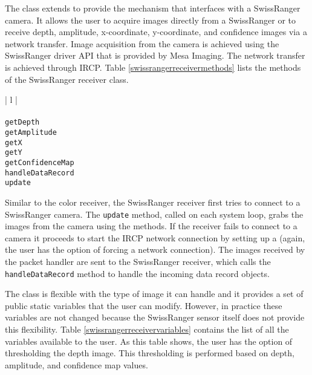 The \SwissRangerReceiver{} class extends \CameraReceiver{} to provide the mechanism that interfaces with a 
SwissRanger camera. It allows the user to acquire images directly from a SwissRanger or to receive depth, 
amplitude, x-coordinate, y-coordinate, and confidence images via a network transfer. Image acquisition from 
the camera is achieved using the SwissRanger driver API that is provided by Mesa Imaging. The network 
transfer is achieved through IRCP. Table \ref{swissrangerreceivermethods} lists the methods of the 
SwissRanger receiver class.

\begin{table}[ht]
\caption{Public methods in the \SwissRangerReceiver{} class}
\begin{center}
\begin{tabular}{| l |}
	\hline 
	 \\
	 \\
	\hline \hline
	\texttt{getDepth} \\
	\texttt{getAmplitude} \\
	\texttt{getX} \\
	\texttt{getY} \\
	\texttt{getConfidenceMap} \\
	\texttt{handleDataRecord} \\
	\texttt{update} \\
	\hline
\end{tabular}
\end{center}
\label{swissrangerreceivermethods}
\end{table}

Similar to the color receiver, the SwissRanger receiver first tries to connect to a Swiss\-Ranger camera. The 
\texttt{up\-date} method, called on each system loop, grabs the images from the camera using the 
\SwissRangerJavaAcquire{} methods. If the receiver fails to connect to a camera it proceeds to start the IRCP 
network connection by setting up a \SwissRangerPacketHandler{} (again, the user has the option of forcing a 
network connection). The images received by the packet handler are sent to the SwissRanger receiver, which 
calls the \texttt{han\-dle\-Da\-ta\-Re\-cord} method to handle the incoming data record objects.

The \SwissRangerReceiver{} class is flexible with the type of image it can handle and it provides a set of 
public static variables that the user can modify. However, in practice these variables are not changed 
because the SwissRanger sensor itself does not provide this flexibility. Table \ref{swissrangerreceivervariables} 
contains the list of all the variables available to the user. As this table shows, the user has the option of 
thresholding the depth image. This thresholding is performed based on depth, amplitude, and confidence map
values. 

